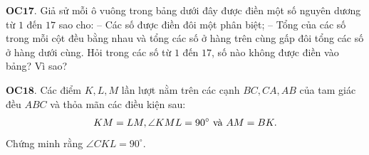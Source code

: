 \begin{multicols}{2}
	\vskip 0.1cm
	{\bf\color{cackithi} OC$\pmb{17.}$} Giả sử mỗi ô vuông trong bảng dưới đây được điền một số nguyên dương từ $1$ đến $17$ sao cho:
	\vskip 0.1cm
	-- Các số được điền đôi một phân biệt;
	\vskip 0.1cm
	-- Tổng của các số trong mỗi cột đều bằng nhau và tổng các số ở hàng trên cùng gấp đôi tổng các số ở hàng dưới cùng.
	\vskip 0.1cm
	Hỏi trong các số từ $1$ đến $17$, số nào không được điền vào bảng? Vì sao?
	\begin{figure}[H]
		\vspace*{-5pt}
		\centering
		\vspace*{-5pt}
	\end{figure}
	{\bf\color{cackithi} OC$\pmb{18.}$} Các điểm $K, L, M$ lần lượt nằm trên các cạnh $BC, CA, AB$ của tam giác đều
	$ABC$ và thỏa mãn các điều kiện sau:
	\begin{align*}
		KM = LM, \angle KML = 90^\circ \ \text{\color{black}và} \ AM = BK.
	\end{align*}
	Chứng minh rằng $\angle CKL = 90^\circ.$
\end{multicols}
